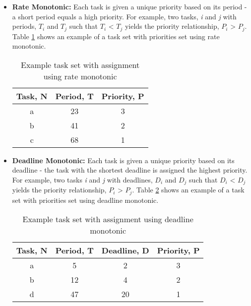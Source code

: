 \begin{itemize}
	\item \textbf{Rate Monotonic:} Each task is given a unique priority based on its period - a short period equals a high priority. For example, two tasks, \textit{i} and \textit{j} with periods, $T_i$ and $T_j$ such that $T_i$ < $T_j$ yields the priority relationship, $P_i$ > $P_j$. Table \ref{table:FPSRateMon} shows an example of a task set with priorities set using rate monotonic.

	\begin{table}[ht]
		\caption{Example task set with assignment using rate monotonic}
			\centering
			\begin{tabular}{c c c}
			\hline\hline
			Task, N & Period, T & Priority, P \\ [0.5ex]
			\hline 
			a & 23 & 3 \\
			b & 41 & 2 \\
			c & 68 & 1 \\ [1ex]
			\hline
			\end{tabular}
		\label{table:FPSRateMon}
	\end{table}

	\item \textbf{Deadline Monotonic:} Each task is given a unique priority based on its deadline - the task with the shortest deadline is assigned the highest priority. For example, two tasks \textit{i} and \textit{j} with deadlines, $D_i$ and $D_j$ such that $D_i$ < $D_j$ yields the priority relationship, $P_i$ > $P_j$. Table \ref{table:FPSDeadlineMon} shows an example of a task set with priorities set using deadline monotonic.

	\begin{table}[ht]
		\caption{Example task set with assignment using deadline monotonic}
			\centering
			\begin{tabular}{c c c c}
			\hline\hline
			Task, N & Period, T & Deadline, D & Priority, P \\ [0.5ex]
			\hline 
			a & 5  & 2  & 3 \\
			b & 12 & 4  & 2 \\
			d & 47 & 20 & 1 \\ [1ex]
			\hline
			\end{tabular}
		\label{table:FPSDeadlineMon}
	\end{table}

\end{itemize}

